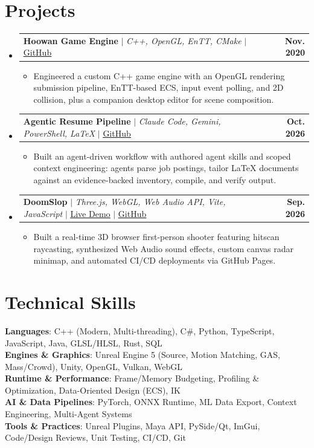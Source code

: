 \documentclass[letterpaper,11pt]{article}
\makeatletter
\newcommand{\resumeItem}[1]{
  \item\small{
    {#1 \vspace{-2pt}}
  }
}
\newcommand{\resumeProjectHeading}[2]{
    \item
    \begin{tabular*}{1.0\textwidth}{l@{\extracolsep{\fill}}r}
      \small#1 & \textbf{\small #2}\\
    \end{tabular*}\vspace{-7pt}
}
\newcommand{\resumeSubHeadingListStart}{\begin{itemize}[leftmargin=0.0in, label={}]}
\newcommand{\resumeSubHeadingListEnd}{\end{itemize}}
\newcommand{\resumeItemListStart}{\begin{itemize}}
\newcommand{\resumeItemListEnd}{\end{itemize}\vspace{-5pt}}
\makeatother
\begin{document}
\section{Projects}
    \resumeSubHeadingListStart
      \resumeProjectHeading
          {\textbf{Hoowan Game Engine} $|$ \emph{C++, OpenGL, EnTT, CMake} $|$ \href{https://github.com/juanbecerra0/Hoowan}{\underline{GitHub}}}{Nov. 2020}
          \resumeItemListStart
            \resumeItem{Engineered a custom C++ game engine with an OpenGL rendering submission pipeline, EnTT-based ECS, input event polling, and 2D collision, plus a companion desktop editor for scene composition.}
          \resumeItemListEnd
      \resumeProjectHeading
          {\textbf{Agentic Resume Pipeline} $|$ \emph{Claude Code, Gemini, PowerShell, LaTeX} $|$ \href{https://github.com/hoowan-dev/resume}{\underline{GitHub}}}{Oct. 2026}
          \resumeItemListStart
            \resumeItem{Built an agent-driven workflow with authored agent skills and scoped context engineering: agents parse job postings, tailor LaTeX documents against an evidence-backed inventory, compile, and verify output.}
          \resumeItemListEnd
      \resumeProjectHeading
          {\textbf{DoomSlop} $|$ \emph{Three.js, WebGL, Web Audio API, Vite, JavaScript} $|$ \href{https://hoowan-dev.github.io/DoomSlop/}{\underline{Live Demo}} $|$ \href{https://github.com/hoowan-dev/DoomSlop}{\underline{GitHub}}}{Sep. 2026}
          \resumeItemListStart
            \resumeItem{Built a real-time 3D browser first-person shooter featuring hitscan raycasting, synthesized Web Audio sound effects, custom canvas radar minimap, and automated CI/CD deployments via GitHub Pages.}
          \resumeItemListEnd
    \resumeSubHeadingListEnd
\vspace{-10pt}

\section{Technical Skills}
 \begin{itemize}[leftmargin=0.15in, label={}]
    \small{\item{
     \textbf{Languages}{: C++ (Modern, Multi-threading), C\#, Python, TypeScript, JavaScript, Java, GLSL/HLSL, Rust, SQL} \\
     \textbf{Engines \& Graphics}{: Unreal Engine 5 (Source, Motion Matching, GAS, Mass/Crowd), Unity, OpenGL, Vulkan, WebGL} \\
     \textbf{Runtime \& Performance}{: Frame/Memory Budgeting, Profiling \& Optimization, Data-Oriented Design (ECS), IK} \\
     \textbf{AI \& Data Pipelines}{: PyTorch, ONNX Runtime, ML Data Export, Context Engineering, Multi-Agent Systems} \\
     \textbf{Tools \& Practices}{: Unreal Plugins, Maya API, PySide/Qt, ImGui, Code/Design Reviews, Unit Testing, CI/CD, Git}
    }}
 \end{itemize}
 \vspace{-12pt}
\end{document}
